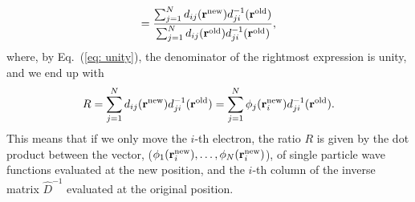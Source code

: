 \documentclass[../main.tex]{subfiles}
\begin{document}
\begin{appendices}
\begin{align}
    = \frac{\sum_{j=1}^N d_{ij}({\bf r}^{\textrm{new}}) d_{ji}^{-1}({\bf r}^{\textrm{old}})}{\sum_{j=1}^N d_{ij}({\bf r}^{\textrm{old}}) d_{ji}^{-1}({\bf r}^{\textrm{old}})},
\end{align}
where, by Eq.~(\ref{eq: unity}), the denominator of the rightmost expression is unity, and we end up with
\begin{align}
    R = \sum_{j=1}^N d_{ij}({\bf r}^{\textrm{new}}) d_{ji}^{-1}({\bf r}^{\textrm{old}}) = \sum_{j=1}^N \phi_j({\bf r}_i^{\textrm{new}}) d_{ji}^{-1}({\bf r}^{\textrm{old}}).
\end{align}
This means that if we only move the $i$-th electron, the ratio $R$ is given by the dot product between the vector, ($\phi_1({\bf r}_i^{\textrm{new}}),\dots,\phi_N({\bf r}_i^{\textrm{new}})$), of single particle wave functions evaluated at the new position, and the $i$-th column of the inverse matrix $\hat{D}^{-1}$ evaluated at the original position.


\end{appendices}
\end{document}
